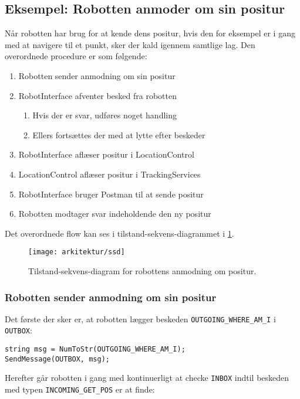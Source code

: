\subsection{Eksempel: Robotten anmoder om sin positur}
Når robotten har brug for at kende dens positur, hvis den for eksempel er i gang med at navigere til et punkt, sker der kald igennem samtlige lag.
Den overordnede procedure er som følgende:
\begin{enumerate}
\item{Robotten sender anmodning om sin positur}
\item{RobotInterface afventer besked fra robotten}
\begin{enumerate}
\item{Hvis der er svar, udføres noget handling}
\item{Ellers fortsættes der med at lytte efter beskeder}
\end{enumerate}
\item{RobotInterface aflæser positur i LocationControl}
\item{LocationControl aflæser positur i TrackingServices}
\item{RobotInterface bruger Postman til at sende positur}
\item{Robotten modtager svar indeholdende den ny positur}
\end{enumerate}
Det overordnede flow kan ses i tilstand-sekvens-diagrammet i \cref{flow:ssd}.

\begin{figure}[H]
\centering
\texttt{[image: arkitektur/ssd]}
\caption{Tilstand-sekvens-diagram for robottens anmodning om positur.}
\label{flow:ssd}
\end{figure}

\subsubsection{Robotten sender anmodning om sin positur}
Det første der sker er, at robotten lægger beskeden \lstinline[style=c]!OUTGOING_WHERE_AM_I! i \lstinline[style=c]!OUTBOX!:

\begin{lstlisting}[style=csmall,label=lst:whereami_request,caption=Robotten sender anmodning om positur.]
string msg = NumToStr(OUTGOING_WHERE_AM_I);
SendMessage(OUTBOX, msg);
\end{lstlisting}

Herefter går robotten i gang med kontinuerligt at checke \lstinline[style=c]!INBOX! indtil beskeden med typen \lstinline[style=c]!INCOMING_GET_POS! er at finde:

